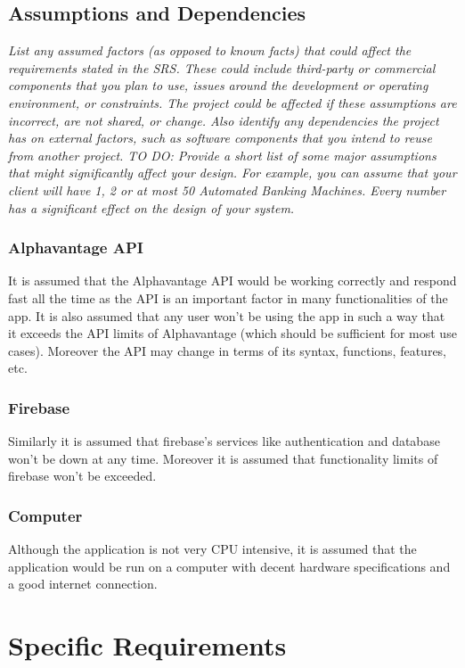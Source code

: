 \documentclass[12 pt, a4paper]{report}
\begin{document}
	\section {Assumptions and Dependencies}
	\textit{List any assumed factors (as opposed to known facts) that could affect the requirements stated in the SRS. These could include third-party or commercial components that you plan to use, issues around the development or operating environment, or constraints. The project could be affected if these assumptions are incorrect, are not shared, or change. Also identify any dependencies the project has on external factors, such as software components that you intend to reuse from another project. 
	TO DO: Provide a short list of some major assumptions that might significantly affect your design. For example, you can assume that your client will have 1, 2 or at most 50 Automated Banking Machines. Every number has a significant effect on the design of your system.}\\
	\subsection{Alphavantage API}
	It is assumed that the Alphavantage API would be working correctly and respond fast all the time as the API is an important factor in many functionalities of the app. It is also assumed that any user won't be using the app in such a way that it exceeds the API limits of Alphavantage (which should be sufficient for most use cases). Moreover the API may change in terms of its syntax, functions, features, etc.

	\subsection{Firebase}
	Similarly it is assumed that firebase's services like authentication and database won't be down at any time. Moreover it is assumed that functionality limits of firebase won't be exceeded.
	
	\subsection{Computer}
	Although the application is not very CPU intensive, it is assumed that the application would be run on a computer with decent hardware specifications and a good internet connection.
	

	\chapter {Specific Requirements}
\end{document}
